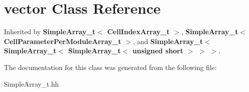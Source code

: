 \section{vector Class Reference}
\label{classstd_1_1vector}


Inherited by {\bf SimpleArray\_\-t$<$ CellIndexArray\_\-t $>$}, {\bf SimpleArray\_\-t$<$ CellParameterPerModuleArray\_\-t $>$}, and {\bf SimpleArray\_\-t$<$ SimpleArray\_\-t$<$ SimpleArray\_\-t$<$ unsigned short $>$ $>$ $>$}.

The documentation for this class was generated from the following file:\begin{DoxyCompactItemize}
\item 
SimpleArray\_\-t.hh\end{DoxyCompactItemize}
